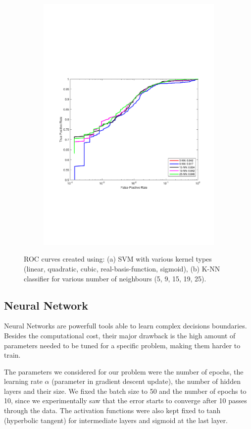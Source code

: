 \begin{figure}[h]
\begin{subfigure}[b]{0.49\textwidth}
    \includegraphics[width=\textwidth]{figures/K_NN.pdf}
    \caption{}
    \label{fig:K_NN}
  \end{subfigure}
  \caption{ROC curves created using: (a) SVM with various kernel types (linear, quadratic, cubic, real-basis-function, sigmoid), (b) K-NN classifier for various number of neighbours (5, 9, 15, 19, 25).}
\end{figure}
\subsection{Neural Network}
Neural Networks are powerfull tools able to learn complex decisions boundaries. Besides the computational cost, their major drawback is the high amount of parameters needed to be tuned for a specific problem, making them harder to train.

The parameters we considered for our problem were the number of epochs, the learning rate $\alpha$ (parameter in gradient descent update), the number of hidden layers and their size. We fixed the batch size to 50 and the number of epochs to 10, since we experimentally saw that the error starts to converge after 10 passes through the data. The activation functions were also kept fixed to tanh (hyperbolic tangent) for intermediate layers and sigmoid at the last layer. 

